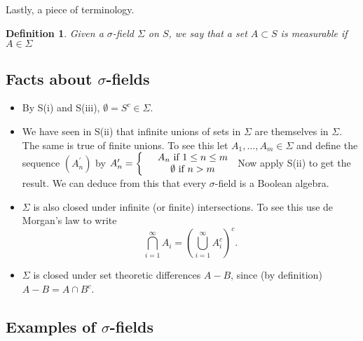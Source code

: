 \documentclass[a4paper]{report}
\newcounter{thm_counter}[chapter]
\newtheorem{defn}[thm_counter]{Definition}
\numberwithin{equation}{chapter}
\numberwithin{thm_counter}{section}
\begin{document}
Lastly, a piece of terminology.

\begin{defn}
Given a $\sigma$-field $\Sigma$ on $S$, we say that a set $A \subset S$ is {\it measurable} if $A \in \Sigma$
\end{defn}



\newpage
\subsection*{Facts about $\sigma$-fields}

\begin{itemize}

\item By S(i) and S(iii), $\emptyset = S^{c} \in \Sigma$.

\item We have seen in S(ii) that infinite unions of sets in
$\Sigma$ are themselves in $\Sigma$. The same is true of finite
unions. To see this let $A_{1}, \ldots, A_{m} \in \Sigma$ and define the sequence $(A_{n}^{\prime})$ by
$ A_{n}^{\prime}  = \left\{ \begin{array}{c c}  & A_{n} ~\mbox{if}~1 \leq n \leq m\\
 & \emptyset ~\mbox{if}~n > m \end{array} \right.$
 Now apply S(ii) to get the result. We can deduce from this that every $\sigma$-field is a Boolean algebra.


\item $\Sigma$ is also closed under infinite (or finite) intersections. To see
this use de Morgan's law to write
$$ \bigcap_{i=1}^{\infty} A_{i} = \left(\bigcup_{i=1}^{\infty} A_{i}^{c}\right)^{c}.$$

\item $\Sigma$ is closed under set theoretic differences $A-B$,
since (by definition) $A-B = A \cap B^{c}$.

\end{itemize}



\subsection*{Examples of $\sigma$-fields}
\end{document}
